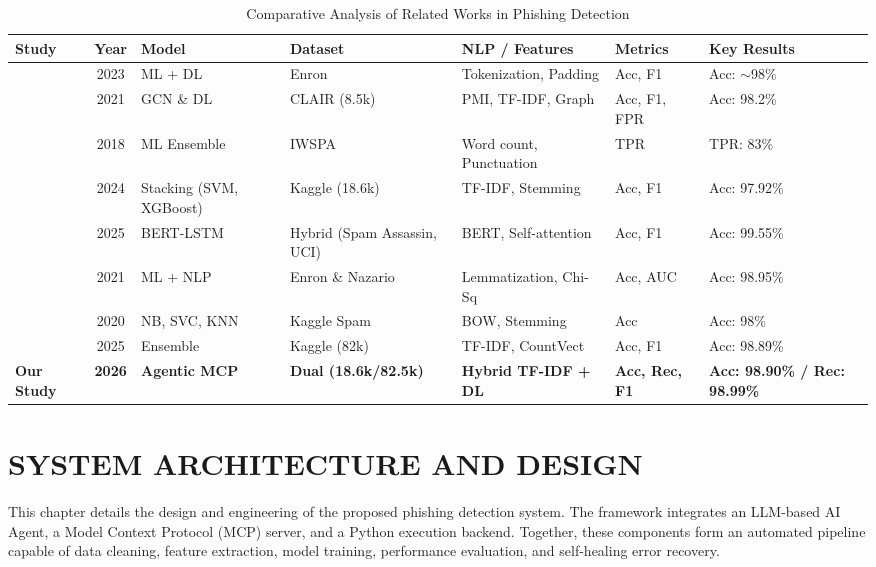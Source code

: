\documentclass[conference]{IEEEtran}
\begin{document}
\begin{table}[!t]
\centering
\caption{Comparative Analysis of Related Works in Phishing Detection}
\label{tab:literature_review}
\small
\begin{tabularx}{\textwidth}{@{}l c l l X l l@{}}
\toprule
\textbf{Study} & \textbf{Year} & \textbf{Model} & \textbf{Dataset} & \textbf{NLP / Features} & \textbf{Metrics} & \textbf{Key Results} \\ \midrule
\cite{paradkar2023phishing} & 2023 & ML + DL & Enron & Tokenization, Padding & Acc, F1 & Acc: $\sim$98\% \\ \addlinespace
\cite{alhogail2021applying} & 2021 & GCN \& DL & CLAIR (8.5k) & PMI, TF-IDF, Graph & Acc, F1, FPR & Acc: 98.2\% \\ \addlinespace
\cite{egozi2018phishing} & 2018 & ML Ensemble & IWSPA & Word count, Punctuation & TPR & TPR: 83\% \\ \addlinespace
\cite{anirudh2024ensemble} & 2024 & Stacking (SVM, XGBoost) & Kaggle (18.6k) & TF-IDF, Stemming & Acc, F1 & Acc: 97.92\% \\ \addlinespace
\cite{chinta2025building} & 2025 & BERT-LSTM & Hybrid (Spam Assassin, UCI) & BERT, Self-attention & Acc, F1 & Acc: 99.55\% \\ \addlinespace
\cite{bountakas2021comparison} & 2021 & ML + NLP & Enron \& Nazario & Lemmatization, Chi-Sq & Acc, AUC & Acc: 98.95\%  \\ \addlinespace
\cite{kumar2020email} & 2020 & NB, SVC, KNN & Kaggle Spam & BOW, Stemming & Acc & Acc: 98\% \\ \addlinespace
\cite{patil2025integrating} & 2025 & Ensemble & Kaggle (82k) & TF-IDF, CountVect & Acc, F1 & Acc: 98.89\%  \\ \addlinespace
\textbf{Our Study} & \textbf{2026} & \textbf{Agentic MCP} & \textbf{Dual (18.6k/82.5k)} & \textbf{Hybrid TF-IDF + DL} & \textbf{Acc, Rec, F1} & \textbf{Acc: 98.90\% / Rec: 98.99\%} \\
\bottomrule
\end{tabularx}
\end{table}



\section{SYSTEM ARCHITECTURE AND DESIGN}
\label{sec:architecture}

This chapter details the design and engineering of the proposed phishing detection system. The framework integrates an LLM-based AI Agent, a Model Context Protocol (MCP) server, and a Python execution backend. Together, these components form an automated pipeline capable of data cleaning, feature extraction, model training, performance evaluation, and self-healing error recovery.
\end{document}
